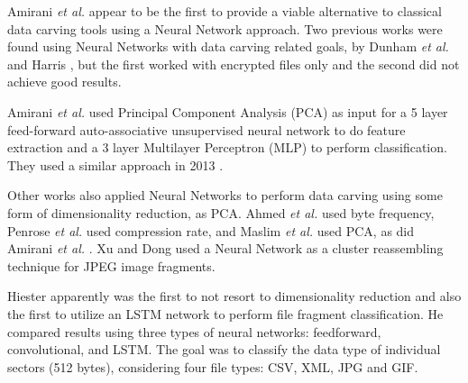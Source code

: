 
Amirani \textit{et al.}  \cite{amirani_new_2008} appear to be the first 
to provide a viable alternative to classical data carving tools using a Neural Network approach. Two previous works were found using Neural Networks with data carving related goals, by Dunham \textit{et al.} \cite{dunham_classifying_2005} and Harris \cite{harris_using_2007}, but the first worked with encrypted files only and the second did not achieve good results.

Amirani \textit{et al.}  \cite{amirani_new_2008} used Principal Component Analysis (PCA) as input for a 5 layer feed-forward auto-associative unsupervised neural network to do feature extraction and a 3 layer Multilayer Perceptron (MLP) to perform classification. They used a similar approach in 2013 \cite{amirani_feature-based_2013}.

Other works also applied Neural Networks to perform data carving using some form of dimensionality reduction, as PCA. Ahmed \textit{et al.} \cite{ahmed_content-based_2010}\cite{ahmed_fast_2011} used byte frequency, 
Penrose \textit{et al.} \cite{penrose_approaches_2013} used compression rate,
and Maslim \textit{et al.} \cite{maslim_distributed_2014} used PCA, as did Amirani \textit{et al.}  \cite{amirani_new_2008}.
Xu and Dong \cite{xu_reassembling_2009} used a Neural Network as a cluster reassembling technique for JPEG image fragments.

Hiester \cite{hiester_file_2018} apparently was the first to not resort to dimensionality reduction and also the first to utilize an LSTM network to perform file fragment classification. He compared results using three types of neural networks: feedforward, convolutional, and LSTM. The goal was to classify the data type of individual sectors (512 bytes), considering four file types: CSV, XML, JPG and GIF.

% 